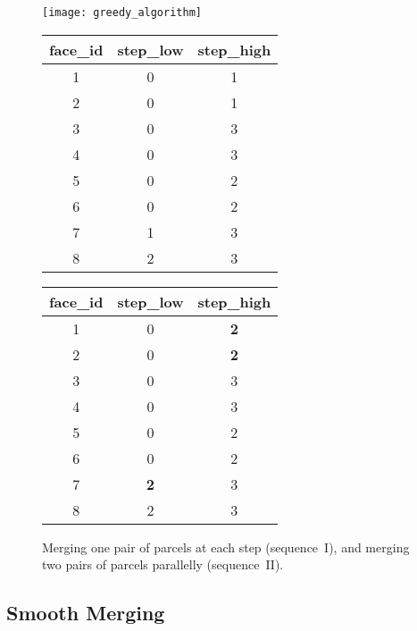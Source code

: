 \documentclass[ijgi,article,submit,moreauthors,pdftex]{Definitions/mdpi}
\begin{document}
\begin{figure}[tb]
\centering
\texttt{[image: greedy\_algorithm]}
\caption{Merging one pair of parcels at each step (sequence~I), 
    and merging two pairs of parcels parallelly (sequence~II).}
\label{fig:face_tgap}
\vspace{6mm} %
%
%
%
\parbox{.49\linewidth}{
\label{tab:face_tgap}
\centering
\begin{tabular}{ccc}
\hline
face\_id &   step\_low   & step\_high    \\ \hline
1       &     0         &     1          \\
2       &     0         &     1          \\
3       &     0         &     3          \\ 
4       &     0         &     3          \\
5       &     0         &     2          \\
6       &     0         &     2          \\         
7       &     1         &     3          \\
8       &     2         &     3          \\ \hline
\end{tabular}
}
%
%
\parbox{.49\linewidth}{
\label{tab:face_tgap_parallel}
\centering
\begin{tabular}{ccc}
\hline
face\_id &   step\_low   & step\_high    \\ \hline
1       &     0         & \textbf{2}          \\
2       &     0         & \textbf{2}          \\
3       &     0         &     3          \\ 
4       &     0         &     3          \\
5       &     0         &     2          \\
6       &     0         &     2          \\         
7       &  \textbf{2}   &     3          \\
8       &     2         &     3          \\ \hline
\end{tabular}
}
\end{figure}


\subsection{Smooth Merging}
\end{document}
